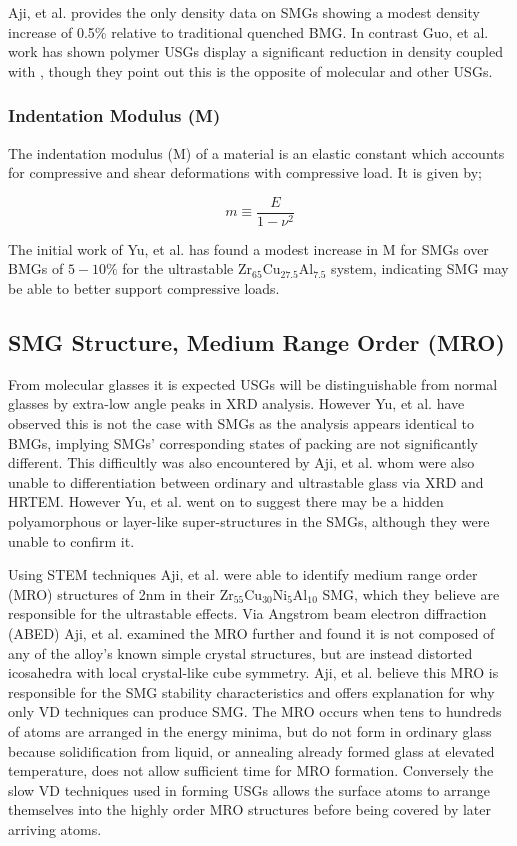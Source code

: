 \documentclass[a4paper,12pt,oneside]{report}%
\begin{document}
Aji, et al. \cite{Aji2013} provides the only density data on SMGs showing a modest density increase of 0.5\% relative to traditional quenched BMG. In contrast Guo, et al. \cite{Guo2012} work has shown polymer USGs display a significant reduction in density coupled with \dTg, though they point out this is the opposite of molecular and other USGs. 

\subsubsection{Indentation Modulus (M)}
The indentation modulus (M) of a material is an elastic constant which accounts for compressive and shear deformations with compressive load. It is given by;

\begin{equation}
m \equiv 
\frac{E}
{1-\nu^{2}}
\label{equ:IndentModulus}
\end{equation}

The initial work of Yu, et al. \cite{Yu2013} has found a modest increase in M for SMGs over BMGs of $5- 10\%$ for the ultrastable Zr$_{65}$Cu$_{27.5}$Al$_{7.5}$ system, indicating SMG may be able to better support compressive loads.

\subsection{SMG Structure, Medium Range Order (MRO)}
From molecular glasses it is expected USGs will be distinguishable from normal glasses by extra-low angle peaks in XRD analysis. However Yu, et al. \cite{Yu2013} have observed this is not the case with SMGs as the analysis appears identical to BMGs, implying SMGs' corresponding states of packing are not significantly different. This difficultly was also encountered by Aji, et al. \cite{Aji2013} whom were also unable to differentiation between ordinary and ultrastable glass via XRD and HRTEM. However Yu, et al. \cite{Yu2013} went on to suggest there may be a hidden polyamorphous or layer-like super-structures in the SMGs, although they were unable to confirm it. 

Using STEM techniques Aji, et al. \cite{Aji2013} were able to identify medium range order (MRO) structures of 2nm in their Zr$_{55}$Cu$_{30}$Ni$_{5}$Al$_{10}$ SMG, which they believe are responsible for the ultrastable effects. Via Angstrom beam electron diffraction (ABED) Aji, et al. \cite{Aji2013} examined the MRO further and found it is not composed of any of the alloy's known simple crystal structures, but are instead distorted icosahedra with local crystal-like cube symmetry. Aji, et al. \cite{Aji2013} believe this MRO is responsible for the SMG stability characteristics and offers explanation for why only VD techniques can produce SMG. The MRO occurs when tens to hundreds of atoms are arranged in the energy minima, but do not form in ordinary glass because solidification from liquid, or annealing already formed glass at elevated temperature, does not allow sufficient time for MRO formation. Conversely the slow VD techniques used in forming USGs allows the surface atoms to arrange themselves into the highly order MRO structures before being covered by later arriving atoms.
\end{document}
